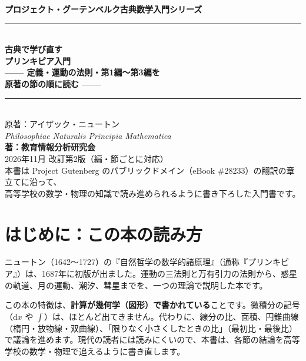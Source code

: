 \documentclass[a4paper,11pt,openany]{ltjsbook}
\newcommand{\dd}{\mathrm{d}}
\begin{document}
\begin{titlepage}
\begin{center}
\vspace*{1.5cm}
{\Large\bfseries プロジェクト・グーテンベルク古典数学入門シリーズ}\\[0.8cm]
\rule{\textwidth}{1.5pt}\\[0.4cm]
{\Huge\bfseries 古典で学び直す\\プリンキピア入門}\\[0.4cm]
{\Large\bfseries —— 定義・運動の法則・第1編〜第3編を\\原著の節の順に読む ——}\\[0.4cm]
\rule{\textwidth}{1.5pt}\\[1.5cm]
{\large 原著：アイザック・ニュートン\\
\textit{Philosophiae Naturalis Principia Mathematica}}\\[2.0cm]
{\Large\bfseries 著：教育情報分析研究会}\\[2.5cm]
\vfill
{\large 2026年11月 改訂第2版（編・節ごとに対応）}\\[0.5cm]
{\footnotesize 本書は Project Gutenberg のパブリックドメイン（eBook \#28233）の翻訳の章立てに沿って、\\
高等学校の数学・物理の知識で読み進められるように書き下ろした入門書です。}
\end{center}
\end{titlepage}

\frontmatter
\tableofcontents
\mainmatter

\chapter*{はじめに：この本の読み方}

ニュートン（1642〜1727）の『自然哲学の数学的諸原理』（通称『プリンキピア』）は、1687年に初版が出ました。運動の三法則と万有引力の法則から、惑星の軌道、月の運動、潮汐、彗星までを、一つの理論で説明した本です。

この本の特徴は、\textbf{計算が幾何学（図形）で書かれている}ことです。微積分の記号（$\dd x$ や $\int$）は、ほとんど出てきません。代わりに、線分の比、面積、円錐曲線（楕円・放物線・双曲線）、「限りなく小さくしたときの比」（最初比・最後比）で議論を進めます。現代の読者には読みにくいので、本書は、各節の結論を高等学校の数学・物理で追えるように書き直します。
\end{document}
